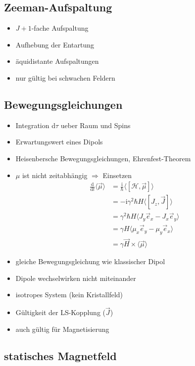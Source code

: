 \documentclass[
	a4paper,%
	twoside,%
	index=totoc,
	parskip=half,
 	chapterprefix,%
	headsepline,%
	13pt,%
	BCOR5mm,%
	fleqn,%
  openany,%
  ngerman
]{scrbook}
\begin{document}
\subsection{Zeeman-Aufspaltung}

\begin{itemize}
\item $J+1$-fache Aufspaltung
\item Aufhebung der Entartung
\item äquidistante Aufspaltungen
\item nur gültig bei schwachen Feldern
\end{itemize}

\subsection{Bewegungsgleichungen}

\begin{itemize}
\item Integration d$\tau$ ueber Raum und Spins
\item Erwartungswert eines Dipols
\item Heisenbersche Bewegungsgleichungen, Ehrenfest-Theorem
\item $\mu$ ist nicht zeitabhängig $\Rightarrow$ Einsetzen
    \begin{align}
    \frac{\mathrm{d}}{\mathrm{d}t} \langle \vec \mu \rangle &= \frac{\mathrm{i}}{\hbar} \langle \left[\mathcal{H}, \vec \mu\right]\rangle
    \\ &=-\mathrm{i}\gamma^2\hbar H \langle [ J_z, \vec J ]\rangle
    \\ &=\gamma^2 \hbar H \langle J_y \vec e_x - J_x \vec e_y \rangle
    \\ &= \gamma H \langle \mu_x \vec e_y - \mu_y \vec e_x \rangle
    \\ &=\gamma \vec H \times \langle \vec \mu \rangle
    \end{align}
\item gleiche Bewegungsgleichung wie klassischer Dipol
\item Dipole wechselwirken nicht miteinander
\item isotropes System (kein Kristallfeld)
\item Gültigkeit der LS-Kopplung ($\vec J$)
\item auch gültig für Magnetisierung
\end{itemize}

\subsection{statisches Magnetfeld}
\end{document}
